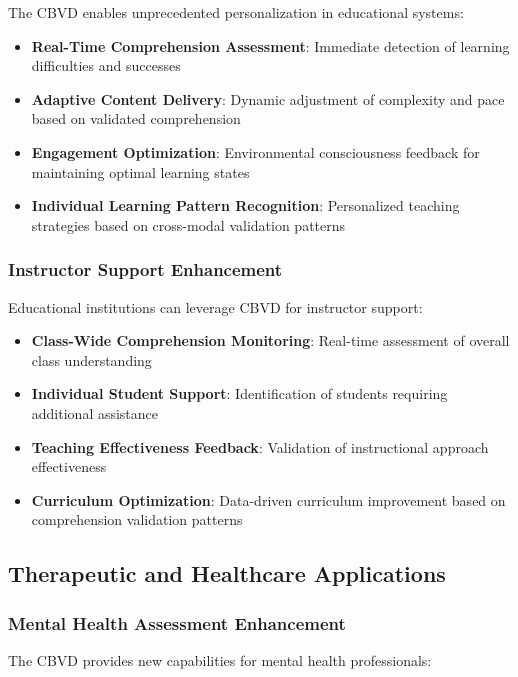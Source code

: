 \documentclass[12pt,a4paper]{article}
\begin{document}
The CBVD enables unprecedented personalization in educational systems:

\begin{itemize}
\item \textbf{Real-Time Comprehension Assessment}: Immediate detection of learning difficulties and successes
\item \textbf{Adaptive Content Delivery}: Dynamic adjustment of complexity and pace based on validated comprehension
\item \textbf{Engagement Optimization}: Environmental consciousness feedback for maintaining optimal learning states
\item \textbf{Individual Learning Pattern Recognition}: Personalized teaching strategies based on cross-modal validation patterns
\end{itemize}

\subsubsection{Instructor Support Enhancement}

Educational institutions can leverage CBVD for instructor support:

\begin{itemize}
\item \textbf{Class-Wide Comprehension Monitoring}: Real-time assessment of overall class understanding
\item \textbf{Individual Student Support}: Identification of students requiring additional assistance
\item \textbf{Teaching Effectiveness Feedback}: Validation of instructional approach effectiveness
\item \textbf{Curriculum Optimization}: Data-driven curriculum improvement based on comprehension validation patterns
\end{itemize}

\subsection{Therapeutic and Healthcare Applications}

\subsubsection{Mental Health Assessment Enhancement}

The CBVD provides new capabilities for mental health professionals:
\end{document}
